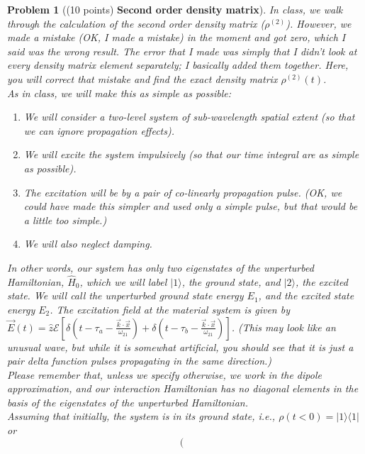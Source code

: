 \documentclass[UTF8,10pt,a4paper]{article}
\theoremstyle{Problem}
\newtheorem{prob}{Problem}
\theoremstyle{Solution}
\begin{document}
\thispagestyle{FirstPageStyle}
\begin{prob}[(10 points) \textbf{Second order density matrix}]
    In class, we walk through the calculation of the second order density matrix ($\rho^{(2)}$). However, we made a mistake (OK, I made a mistake) in the moment and got zero, which I said was the wrong result. The error that I made was simply that I didn't look at every density matrix element separately; I basically added them together. Here, you will correct that mistake and find the exact density matrix $\rho^{(2)}(t)$.\\
    As in class, we will make this as simple as possible:
    \begin{enumerate}
        \item[(a)] We will consider a two-level system of sub-wavelength spatial extent (so that we can ignore propagation effects).
        \item[(b)] We will excite the system impulsively (so that our time integral are as simple as possible).
        \item[(c)] The excitation will be by a pair of co-linearly propagation pulse. (OK, we could have made this simpler and used only a simple pulse, but that would be a little too simple.)
        \item[(d)] We will also neglect damping.
    \end{enumerate}
    In other words, our system has only two eigenstates of the unperturbed Hamiltonian, $\hat{H}_0$, which we will label $\lvert 1\rangle$, the ground state, and $\lvert 2\rangle$, the excited state. We will call the unperturbed ground state energy $E_1$, and the excited state energy $E_2$. The excitation field at the material system is given by $\vec{E}(t)=\hat{z}\mathscr{E}[\delta(t-\tau_a-\frac{\vec{k}\cdot\vec{x}}{\omega_{21}})+\delta(t-\tau_b-\frac{\vec{k}\cdot\vec{x}}{\omega_{21}})]$. (This may look like an unusual wave, but while it is somewhat artificial, you should see that it is just a pair delta function pulses propagating in the same direction.)\\
    Please remember that, unless we specify otherwise, we work in the dipole approximation, and our interaction Hamiltonian has no diagonal elements in the basis of the eigenstates of the unperturbed Hamiltonian.\\
    Assuming that initially, the system is in its ground state, i.e., $\rho(t<0)=\lvert 1\rangle\langle 1\rvert$ or
    \begin{equation}
        \left(\begin{matrix}

\end{matrix}
\end{equation}
\end{prob}
\end{document}
